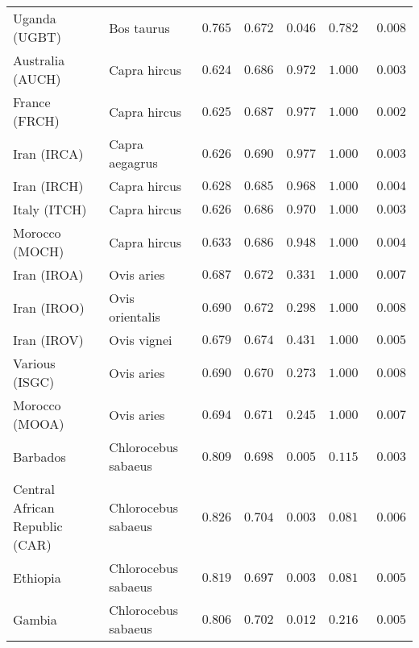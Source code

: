 \begin{center}
\begin{adjustbox}{width = 1\textwidth}
\begin{tabular}{|l|l|r|r|r|r|r|}
            Uganda (UGBT)                  & Bos taurus        & $ 0.765$ & $ 0.672$ & $ 0.046$ & $ 0.782~~$     & $ 0.008$ \\
            Australia (AUCH)                    & Capra hircus      & $ 0.624$ & $ 0.686$ & $ 0.972$ & $ 1.000~~$     & $ 0.003$ \\
            France (FRCH)                    & Capra hircus        & $ 0.625$ & $ 0.687$ & $ 0.977$ & $ 1.000~~$     & $ 0.002$ \\
            Iran (IRCA)                   & Capra aegagrus        & $ 0.626$ & $ 0.690$ & $ 0.977$ & $ 1.000~~$     & $ 0.003$ \\
            Iran (IRCH)                 & Capra hircus        & $ 0.628$ & $ 0.685$ & $ 0.968$ & $ 1.000~~$     & $ 0.004$ \\
            Italy (ITCH)                    & Capra hircus          & $ 0.626$ & $ 0.686$ & $ 0.970$ & $ 1.000~~$     & $ 0.003$ \\
            Morocco (MOCH)                    & Capra hircus     & $ 0.633$ & $ 0.686$ & $ 0.948$ & $ 1.000~~$     & $ 0.004$ \\
            Iran (IROA)                    & Ovis aries         & $ 0.687$ & $ 0.672$ & $ 0.331$ & $ 1.000~~$     & $ 0.007$ \\
            Iran (IROO)                 & Ovis orientalis          & $ 0.690$ & $ 0.672$ & $ 0.298$ & $ 1.000~~$     & $ 0.008$ \\
            Iran (IROV)                 & Ovis vignei          & $ 0.679$ & $ 0.674$ & $ 0.431$ & $ 1.000~~$     & $ 0.005$ \\
            Various (ISGC)                       & Ovis aries & $ 0.690$ & $ 0.670$ & $ 0.273$ & $ 1.000~~$     & $ 0.008$ \\
            Morocco (MOOA) & Ovis aries & $ 0.694$ & $ 0.671$ & $ 0.245$ & $ 1.000~~$ & $ 0.007$ \\
            Barbados                       & Chlorocebus sabaeus & $ 0.809$ & $ 0.698$ & $ 0.005$ & $ 0.115~~$     & $ 0.003$ \\
            Central African Republic (CAR)                         & Chlorocebus sabaeus & $ 0.826$ & $ 0.704$ & $ 0.003$ & $ 0.081~~$     & $ 0.006$ \\
            Ethiopia                          & Chlorocebus sabaeus & $ 0.819$ & $ 0.697$ & $ 0.003$ & $ 0.081~~$     & $ 0.005$ \\
            Gambia                          & Chlorocebus sabaeus & $ 0.806$ & $ 0.702$ & $ 0.012$ & $ 0.216~~$     & $ 0.005$ \\

\end{tabular}
\end{adjustbox}
\end{center}
